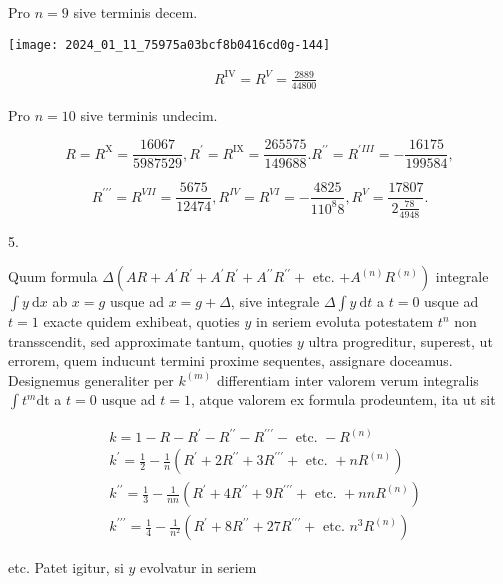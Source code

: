 \documentclass[10pt]{article}
\begin{document}
Pro \(n=9\) sive terminis decem.

\begin{center}
\texttt{[image: 2024\_01\_11\_75975a03bcf8b0416cd0g-144]}
\end{center}

\[
\begin{aligned}
& R^{\mathrm{IV}}=R^{V}=\frac{2889}{44800}
\end{aligned}
\]

Pro \(n=10\) sive terminis undecim.

\[
R=R^{\mathrm{X}}=\frac{16067}{5987529}, R^{\prime}=R^{\mathrm{IX}}=\frac{265575}{149688} . R^{\prime \prime}=R^{\prime I I I}=-\frac{16175}{199584},
\]

\[
R^{\prime \prime \prime}=R^{V I I}=\frac{5675}{12474}, R^{I V}=R^{V I}=-\frac{4825}{110^{8} 8}, R^{V}=\frac{17807}{2 \frac{78}{4948}} .
\]

5.

Quum formula \(\Delta\left(A R+A^{\prime} R^{\prime}+A^{\prime} R^{\prime}+A^{\prime \prime} R^{\prime \prime}+\right.\) etc. \(\left.+A^{(n)} R^{(n)}\right)\) integrale \(\int y \mathrm{~d} x\) ab \(x=g\) usque ad \(x=g+\Delta\), sive integrale \(\Delta \int y \mathrm{~d} t\) a \(t=0\) usque ad \(t=1\) exacte quidem exhibeat, quoties \(y\) in seriem evoluta potestatem \(t^{n}\) non transscendit, sed approximate tantum, quoties \(y\) ultra progreditur, superest, ut errorem, quem inducunt termini proxime sequentes, assignare doceamus. Designemus generaliter per \(k^{(m)}\) differentiam inter valorem verum integralis \(\int t^{m} \mathrm{dt}\) a \(t=0\) usque ad \(t=1\), atque valorem ex formula prodeuntem, ita ut sit

\[
\begin{aligned}
& k=1-R-R^{\prime}-R^{\prime \prime}-R^{\prime \prime \prime}-\text { etc. }-R^{(n)} \\
& k^{\prime}=\frac{1}{2}-\frac{1}{n}\left(R^{\prime}+2 R^{\prime \prime}+3 R^{\prime \prime \prime}+\text { etc. }+n R^{(n)}\right) \\
& k^{\prime \prime}=\frac{1}{3}-\frac{1}{n n}\left(R^{\prime}+4 R^{\prime \prime}+9 R^{\prime \prime \prime}+\text { etc. }+n n R^{(n)}\right) \\
& k^{\prime \prime \prime}=\frac{1}{4}-\frac{1}{n^{2}}\left(R^{\prime}+8 R^{\prime \prime}+27 R^{\prime \prime \prime}+\text { etc. } n^{3} R^{(n)}\right)
\end{aligned}
\]

etc. Patet igitur, si \(y\) evolvatur in seriem
\end{document}
